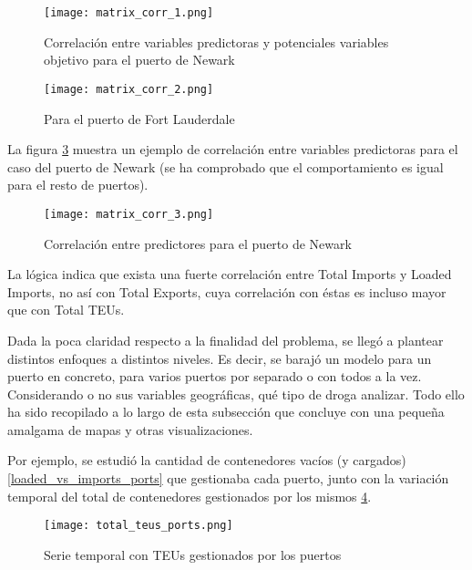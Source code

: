 \documentclass[12pt]{article}
\begin{document}
		\begin{figure}[H]
			\caption{\label{matriz_corr_1} Correlación entre variables predictoras y potenciales variables objetivo para el puerto de Newark}
			\centering
			\hspace*{1cm}
			\texttt{[image: matrix\_corr\_1.png]}
		\end{figure}
	
		\begin{figure}[H]
			\caption{\label{matriz_corr_2} Para el puerto de Fort Lauderdale}
			\centering
			\hspace*{1cm}
			\texttt{[image: matrix\_corr\_2.png]}
		\end{figure}
		
		La figura \ref{matriz_corr_3} muestra un ejemplo de correlación entre variables predictoras para el caso del puerto de Newark (se ha comprobado que el comportamiento es igual para el resto de puertos).
		
		\begin{figure}[H]
			\caption{\label{matriz_corr_3} Correlación entre predictores para el puerto de Newark}
			\centering
			\hspace*{1cm}
			\texttt{[image: matrix\_corr\_3.png]}
		\end{figure}
	
		La lógica indica que exista una fuerte correlación entre Total Imports y Loaded Imports, no así con Total Exports, cuya correlación con éstas es incluso mayor que con Total TEUs.
		
		
		Dada la poca claridad respecto a la finalidad del problema, se llegó a plantear distintos enfoques a distintos niveles. Es decir, se barajó un modelo para un puerto en concreto, para varios puertos por separado o con todos a la vez. Considerando o no sus variables geográficas, qué tipo de droga analizar. Todo ello ha sido recopilado a lo largo de esta subsección que concluye con una pequeña amalgama de mapas y otras visualizaciones.
		
		Por ejemplo, se estudió la cantidad de contenedores vacíos (y cargados) \ref{loaded_vs_imports_ports} que gestionaba cada puerto, junto con la variación temporal del total de contenedores gestionados por los mismos \ref{total_teus_ports}.
		
		\begin{figure}[H]
			\caption{\label{total_teus_ports} Serie temporal con TEUs gestionados por los puertos}
			\centering
			\hspace*{1cm}
			\texttt{[image: total\_teus\_ports.png]}
		\end{figure}
		
\end{document}
